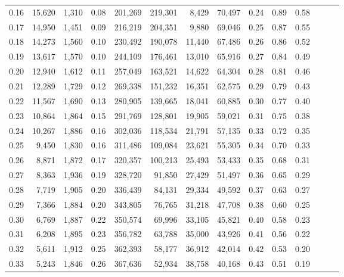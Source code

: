 \begin{tabular}{rrrrrrrrrrrrrr}
0.16 &  15,620 &  1,310 &  0.08 &  201,269 &  219,301 &   8,429 &  70,497 &  0.24 &  0.89 &      0.58 \\
0.17 &  14,950 &  1,451 &  0.09 &  216,219 &  204,351 &   9,880 &  69,046 &  0.25 &  0.87 &      0.55 \\
0.18 &  14,273 &  1,560 &  0.10 &  230,492 &  190,078 &  11,440 &  67,486 &  0.26 &  0.86 &      0.52 \\
0.19 &  13,617 &  1,570 &  0.10 &  244,109 &  176,461 &  13,010 &  65,916 &  0.27 &  0.84 &      0.49 \\
0.20 &  12,940 &  1,612 &  0.11 &  257,049 &  163,521 &  14,622 &  64,304 &  0.28 &  0.81 &      0.46 \\
0.21 &  12,289 &  1,729 &  0.12 &  269,338 &  151,232 &  16,351 &  62,575 &  0.29 &  0.79 &      0.43 \\
0.22 &  11,567 &  1,690 &  0.13 &  280,905 &  139,665 &  18,041 &  60,885 &  0.30 &  0.77 &      0.40 \\
0.23 &  10,864 &  1,864 &  0.15 &  291,769 &  128,801 &  19,905 &  59,021 &  0.31 &  0.75 &      0.38 \\
0.24 &  10,267 &  1,886 &  0.16 &  302,036 &  118,534 &  21,791 &  57,135 &  0.33 &  0.72 &      0.35 \\
0.25 &   9,450 &  1,830 &  0.16 &  311,486 &  109,084 &  23,621 &  55,305 &  0.34 &  0.70 &      0.33 \\
0.26 &   8,871 &  1,872 &  0.17 &  320,357 &  100,213 &  25,493 &  53,433 &  0.35 &  0.68 &      0.31 \\
0.27 &   8,363 &  1,936 &  0.19 &  328,720 &   91,850 &  27,429 &  51,497 &  0.36 &  0.65 &      0.29 \\
0.28 &   7,719 &  1,905 &  0.20 &  336,439 &   84,131 &  29,334 &  49,592 &  0.37 &  0.63 &      0.27 \\
0.29 &   7,366 &  1,884 &  0.20 &  343,805 &   76,765 &  31,218 &  47,708 &  0.38 &  0.60 &      0.25 \\
0.30 &   6,769 &  1,887 &  0.22 &  350,574 &   69,996 &  33,105 &  45,821 &  0.40 &  0.58 &      0.23 \\
0.31 &   6,208 &  1,895 &  0.23 &  356,782 &   63,788 &  35,000 &  43,926 &  0.41 &  0.56 &      0.22 \\
0.32 &   5,611 &  1,912 &  0.25 &  362,393 &   58,177 &  36,912 &  42,014 &  0.42 &  0.53 &      0.20 \\
0.33 &   5,243 &  1,846 &  0.26 &  367,636 &   52,934 &  38,758 &  40,168 &  0.43 &  0.51 &      0.19 \\

\end{tabular}
